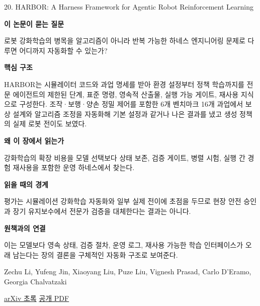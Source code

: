 \documentclass[11pt,openany]{book}
\begin{document}
\begin{termcard}{20. HARBOR: A Harness Framework for Agentic Robot Reinforcement Learning}

\par

\medskip

{\sffamily\bfseries\color{deepblue} 이 논문이 묻는 질문}\par

로봇 강화학습의 병목을 알고리즘이 아니라 반복 가능한 하네스 엔지니어링 문제로 다루면 어디까지 자동화할 수 있는가?

\smallskip

{\sffamily\bfseries\color{deepblue} 핵심 구조}\par

HARBOR는 시뮬레이터 코드와 과업 명세를 받아 환경 설정부터 정책 학습까지를 전문 에이전트의 제한된 단계, 표준 명령, 영속적 산출물, 실행 가능 게이트, 재사용 지식으로 구성한다. 조작·보행·양손 정밀 제어를 포함한 6개 벤치마크 16개 과업에서 보상 설계와 알고리즘 조정을 자동화해 기본 설정과 같거나 나은 결과를 냈고 생성 정책의 실제 로봇 전이도 보였다.

\smallskip

{\sffamily\bfseries\color{deepblue} 왜 이 장에서 읽는가}\par

강화학습의 확장 비용을 모델 선택보다 상태 보존, 검증 게이트, 병렬 시험, 실행 간 경험 재사용을 포함한 운영 하네스에서 찾는다.

\smallskip

{\sffamily\bfseries\color{coral} 읽을 때의 경계}\par

평가는 시뮬레이션 강화학습 자동화와 일부 실제 전이에 초점을 두므로 현장 안전 승인과 장기 유지보수에서 전문가 검증을 대체한다는 결과는 아니다.

\smallskip

{\sffamily\bfseries\color{teal} 원책과의 연결}\par

이는 모델보다 영속 상태, 검증 절차, 운영 로그, 재사용 가능한 학습 인터페이스가 오래 남는다는 장의 결론을 구체적인 자동화 구조로 보여준다.

\medskip

{\footnotesize\color{muted} Zechu Li, Yufeng Jin, Xiaoyang Liu, Puze Liu, Vignesh Prasad, Carlo D'Eramo, Georgia Chalvatzaki\par

\href{https://arxiv.org/abs/2606.08610}{arXiv 초록} \quad \href{https://arxiv.org/pdf/2606.08610}{공개 PDF}\par}

\end{termcard}
\end{document}
